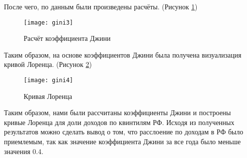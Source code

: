 После чего, по данным были произведены расчёты. (Рисунок \ref{fig:gini3})

\begin{figure}[h]
	\centering \texttt{[image: gini3]}
	\caption{Расчёт коэффициента Джини}
	\label{fig:gini3}
\end{figure}

Таким образом, на основе коэффициентов Джини была получена визуализация кривой Лоренца. (Рисунок \ref{fig:gini4})

\begin{figure}[h]
	\centering \texttt{[image: gini4]}
	\caption{Кривая Лоренца}
	\label{fig:gini4}
\end{figure}

Таким образом, нами были рассчитаны коэффициенты Джини и построены кривые Лоренца для доли доходов по квинтилям РФ. Исходя из полученных результатов можно сделать вывод о том, что расслоение по доходам в РФ было приемлемым, так как значение коэффициента Джини за все года было меньше значения 0.4.